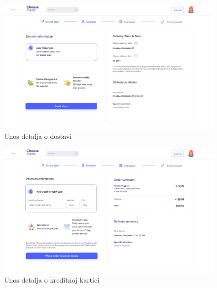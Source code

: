\begin{figure}[H]
	\begin{center}
		\includegraphics[width=\textwidth]{UI/Select Meal Plan (Screen 2).png}
    		\caption{Unos detalja o dostavi}
    \label{fig:SelectMealPlanScreen2}
    \end{center}
\end{figure}

\begin{figure}[H]
	\begin{center}
		\includegraphics[width=\textwidth]{UI/Select Meal Plan (Screen 3).png}
    		\caption{Unos detalja o kreditnoj kartici}
    \label{fig:SelectMealPlanScreen3}
    \end{center}
\end{figure}

